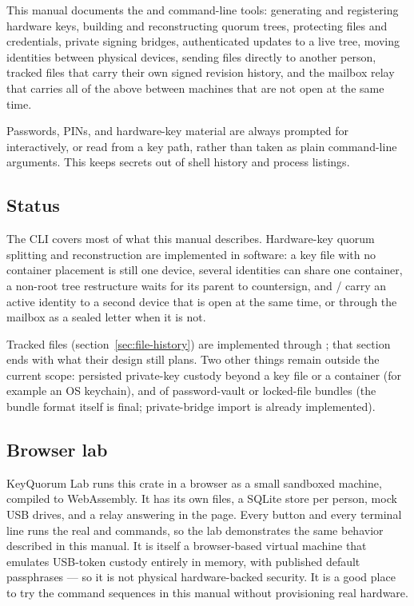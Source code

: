 This manual documents the  and 
command-line tools: generating and registering hardware keys, building and
reconstructing quorum trees, protecting files and credentials, private
signing bridges, authenticated updates to a live tree, moving identities
between physical devices, sending files directly to another person, tracked
files that carry their own signed revision history, and the mailbox relay that carries all of the above between machines that are
not open at the same time.

\begin{noteBox}
Passwords, PINs, and hardware-key material are always prompted for
interactively, or read from a  key path, rather than
taken as plain command-line arguments. This keeps secrets out of shell
history and process listings.
\end{noteBox}

\subsection{Status}

The CLI covers most of what this manual describes. Hardware-key quorum
splitting and reconstruction are implemented in software: a key file with no
container placement is still one device, several identities can share one
container, a non-root tree restructure waits for its parent to countersign,
and  /  carry an active identity to
a second device that is open at the same time, or through the mailbox as a
sealed letter when it is not.

Tracked files (section~\ref{sec:file-history}) are implemented through
; that section ends with what their design still
plans. Two other things remain outside the current scope: persisted private-key custody
beyond a key file or a  container (for example an OS
keychain), and  of password-vault or locked-file
 bundles (the bundle format itself is final; private-bridge
 import is already implemented).

\subsection{Browser lab}

KeyQuorum Lab runs this crate in a browser as a small sandboxed machine,
compiled to WebAssembly. It has its own files, a SQLite store per person,
mock USB drives, and a relay answering in the page. Every button and every
terminal line runs the real  and 
commands, so the lab demonstrates the same behavior described in this
manual. It is itself a browser-based virtual machine that emulates
USB-token custody entirely in memory, with published default passphrases
--- so it is not physical hardware-backed security. It is a good place to try the
command sequences in this manual without provisioning real hardware.

